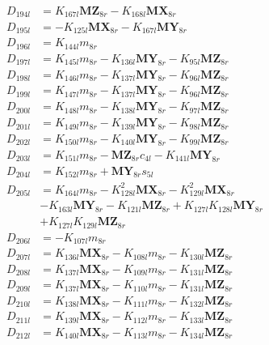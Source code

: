 \begin{multicols}{2}
\begin{align}
D_{194l} &= K_{167l}\mathbf{MZ}_{8r} - K_{168l}\mathbf{MX}_{8r} \nonumber \\
D_{195l} &= - K_{125l}\mathbf{MX}_{8r} - K_{167l}\mathbf{MY}_{8r} \nonumber \\
D_{196l} &= K_{144l}m_{8r} \nonumber \\
D_{197l} &= K_{145l}m_{8r} - K_{136l}\mathbf{MY}_{8r} - K_{95l}\mathbf{MZ}_{8r} \nonumber \\
D_{198l} &= K_{146l}m_{8r} - K_{137l}\mathbf{MY}_{8r} - K_{96l}\mathbf{MZ}_{8r} \nonumber \\
D_{199l} &= K_{147l}m_{8r} - K_{137l}\mathbf{MY}_{8r} - K_{96l}\mathbf{MZ}_{8r} \nonumber \\
D_{200l} &= K_{148l}m_{8r} - K_{138l}\mathbf{MY}_{8r} - K_{97l}\mathbf{MZ}_{8r} \nonumber \\
D_{201l} &= K_{149l}m_{8r} - K_{139l}\mathbf{MY}_{8r} - K_{98l}\mathbf{MZ}_{8r} \nonumber \\
D_{202l} &= K_{150l}m_{8r} - K_{140l}\mathbf{MY}_{8r} - K_{99l}\mathbf{MZ}_{8r} \nonumber \\
D_{203l} &= K_{151l}m_{8r} - \mathbf{MZ}_{8r}c_{4l} - K_{141l}\mathbf{MY}_{8r} \nonumber \\
D_{204l} &= K_{152l}m_{8r} + \mathbf{MY}_{8r}s_{5l} \nonumber \\
D_{205l} &= K_{164l}m_{8r} - K_{128l}^2\mathbf{MX}_{8r} - K_{129l}^2\mathbf{MX}_{8r}  \nonumber \\
&- K_{163l}\mathbf{MY}_{8r} - K_{121l}\mathbf{MZ}_{8r} + K_{127l}K_{128l}\mathbf{MY}_{8r}  \nonumber \\
&+ K_{127l}K_{129l}\mathbf{MZ}_{8r} \nonumber \\
D_{206l} &= -K_{107l}m_{8r} \nonumber \\
D_{207l} &= K_{136l}\mathbf{MX}_{8r} - K_{108l}m_{8r} - K_{130l}\mathbf{MZ}_{8r} \nonumber \\
D_{208l} &= K_{137l}\mathbf{MX}_{8r} - K_{109l}m_{8r} - K_{131l}\mathbf{MZ}_{8r} \nonumber \\
D_{209l} &= K_{137l}\mathbf{MX}_{8r} - K_{110l}m_{8r} - K_{131l}\mathbf{MZ}_{8r} \nonumber \\
D_{210l} &= K_{138l}\mathbf{MX}_{8r} - K_{111l}m_{8r} - K_{132l}\mathbf{MZ}_{8r} \nonumber \\
D_{211l} &= K_{139l}\mathbf{MX}_{8r} - K_{112l}m_{8r} - K_{133l}\mathbf{MZ}_{8r} \nonumber \\
D_{212l} &= K_{140l}\mathbf{MX}_{8r} - K_{113l}m_{8r} - K_{134l}\mathbf{MZ}_{8r} \nonumber \\

\end{align}
\end{multicols}
